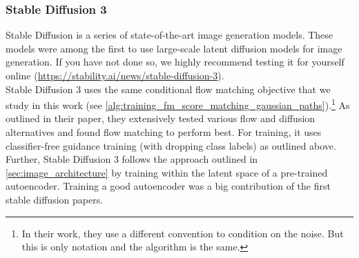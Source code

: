 \subsubsection{Stable Diffusion 3}

Stable Diffusion is a series of state-of-the-art image generation models. These models were among the first to use large-scale latent diffusion models for image generation. If you have not done so, we highly recommend testing it for yourself online (\url{https://stability.ai/news/stable-diffusion-3}).\\

Stable Diffusion 3 uses the same conditional flow matching objective that we study in this work (see \cref{alg:training_fm_score_matching_gaussian_paths}).\footnote{In their work, they use a different convention to condition on the noise. But this is only notation and the algorithm is the same.} As outlined in their paper, they extensively tested various flow and diffusion alternatives and found flow matching to perform best. For training, it uses classifier-free guidance training (with dropping class labels) as outlined above. Further, Stable Diffusion 3 follows the approach outlined in \cref{sec:image_architecture} by training within the latent space of a pre-trained autoencoder. Training a good autoencoder was a big contribution of the first stable diffusion papers.\\

